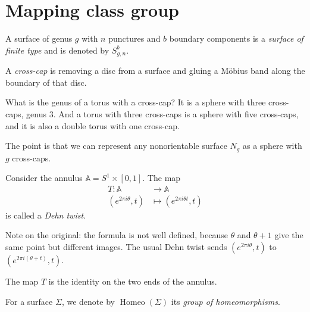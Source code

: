 \section{Mapping class group}
\label{section-mapping-class-group}

\begin{definition}
\label{definition-finite-type}
A surface of genus $g$ with $n$
punctures and $b$ boundary components is
a {\it surface of finite type} and is
denoted by $S^b_{g,n}$.
\end{definition}

\begin{definition}
\label{definition-cross-cap}
A {\it cross-cap} is removing a disc
from a surface and gluing a M\"obius
band along the boundary of that disc.
\end{definition}

\begin{exercise}
\label{exercise-cross-caps}
What is the genus of a torus with a
cross-cap? It is a sphere with three
cross-caps, genus $3$. And a torus with
three cross-caps is a sphere with five
cross-caps, and it is also a double
torus with one cross-cap.
\end{exercise}

The point is that we can represent any
nonorientable surface $N_g$ as a sphere
with $g$ cross-caps.

\begin{definition}
\label{definition-dehn-twist}
Consider the annulus
$\mathbb{A}=S^1\times[0,1]$. The map
$$
\begin{aligned}
T:\mathbb{A}&\to\mathbb{A}\\
(e^{2\pi i\theta},t)&\mapsto
(e^{2\pi i\theta t},t)
\end{aligned}
$$
is called a {\it Dehn twist}.
\end{definition}

Note on the original: the formula is
not well defined, because $\theta$ and
$\theta+1$ give the same point but
different images. The usual Dehn twist
sends $(e^{2\pi i\theta},t)$ to
$(e^{2\pi i(\theta+t)},t)$.

\begin{remark}
\label{remark-dehn-twist-boundary}
The map $T$ is the identity on the two
ends of the annulus.
\end{remark}

\begin{definition}
\label{definition-homeo}
For a surface $\Sigma$, we denote by
$\operatorname{Homeo}(\Sigma)$ its
{\it group of homeomorphisms}.
\end{definition}

